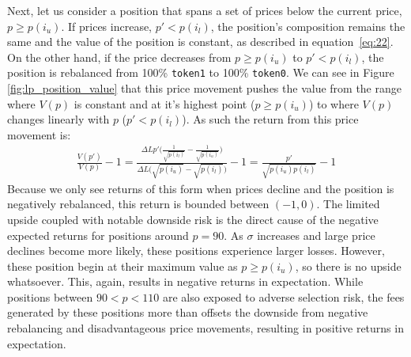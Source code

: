 \documentclass[11pt]{article}
\begin{document}
Next, let us consider a position that spans a set of prices below the current price, $p \ge p(i_u)$. If prices increase, $p' < p(i_l)$, the position's composition remains the same and the value of the position is constant, as described in equation~\eqref{eq:22}. On the other hand, if the price decreases from $p \ge p(i_u)$ to $p' < p(i_l)$, the position is rebalanced from 100\% \texttt{token1} to 100\% \texttt{token0}. We can see in Figure \ref{fig:lp_position_value} that this price movement pushes the value from the range where $V(p)$ is constant and at it's highest point ($p \ge p(i_u)$) to where $V(p)$ changes linearly with $p$ ($p' < p(i_l)$). As such the return from this price movement is:
\begin{gather}
    \frac{V(p')}{V(p)} - 1 = \frac{\Delta L p' \bigg( \frac{1}{\sqrt{p(i_l)}} - \frac{1}{\sqrt{p(i_u)}} \bigg)}{\Delta L \big( \sqrt{p(i_u)} - \sqrt{p(i_l)} \big)} - 1 = \frac{p'}{\sqrt{p(i_u) p(i_l)}} - 1
\end{gather}
Because we only see returns of this form when prices decline and the position is negatively rebalanced, this return is bounded between $(-1, 0)$. The limited upside coupled with notable downside risk is the direct cause of the negative expected returns for positions around $p=90$. As $\sigma$ increases and large price declines become more likely, these positions experience larger losses. However, these position begin at their maximum value as $p \ge p(i_u)$, so there is no upside whatsoever. This, again, results in negative returns in expectation. While positions between $90 < p < 110$ are also exposed to adverse selection risk, the fees generated by these positions more than offsets the downside from negative rebalancing and disadvantageous price movements, resulting in positive returns in expectation.
\end{document}
